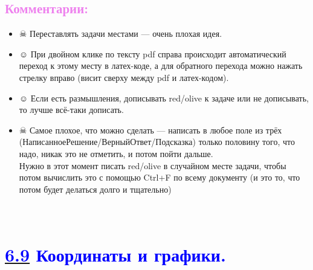 \documentclass[12pt]{article}
\newcounter{num}
\newenvironment{mylist} %
{ \begin{itemize}
    \setlength{\itemsep}{0pt}
    \setlength{\parskip}{0pt}
    \setlength{\parsep}{0pt}     }
{ \end{itemize}                  }
\begin{document}
\subsection*{\textcolor{Violet}{\textbf{Комментарии:}}}%
\begin{mylist}
\item [$\skull$] Переставлять задачи местами --- очень плохая идея.

\item [$\smiley$] При двойном клике по тексту pdf справа происходит автоматический переход к этому месту в латех-коде, а для обратного перехода можно нажать стрелку вправо (висит сверху между pdf и латех-кодом).

\item [$\smiley$] Если есть размышления, дописывать red/olive к задаче или не дописывать, то лучше всё-таки дописать.

\item [$\skull$] Самое плохое, что можно сделать --- написать в любое поле из трёх (НаписанноеРешение/ВерныйОтвет/Подсказка) только половину того, что надо, никак это не отметить, и потом пойти дальше.\\ Нужно в этот момент писать red/olive в случайном месте задачи, чтобы потом вычислить это с помощью Ctrl+F по всему документу (и это то, что потом будет делаться долго и тщательно)
\end{mylist}

\newpage
\setcounter{num}{434}

\hypertarget{6.9}{{\centering\section*{\bigskip\\\textcolor{Blue}{\hyperlink{start2}{\textcolor{Blue}{6.9}} Координаты и графики.}\vspace{-5mm}}}}
\end{document}

